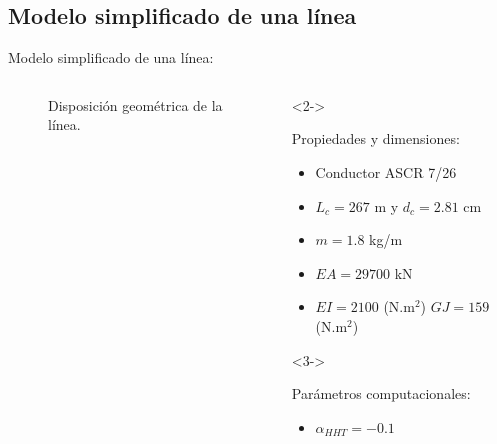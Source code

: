 \documentclass[
  aspectratio=169,
]{beamer}
\begin{document}
\begin{small}
\subsection[Modelo simplificado de una línea]{Modelo simplificado de una línea}
\begin{frame}[t]{Modelo simplificado de una línea:}
	\begin{columns}[T,onlytextwidth]
		\begin{column}{.58\textwidth}
			\begin{minipage}{\textwidth}
					\begin{figure}[htbp]
					\centering
					\caption{Disposición geométrica de la línea.} 
				\end{figure}
			\end{minipage}  
		\end{column}
		\begin{column}{.4\textwidth}
			\begin{onlyenv}<2->
				\begin{minipage}{\textwidth}
					\vspace{-1.7cm}
					\begin{block}{Propiedades y dimensiones:}
						\begin{itemize}
							\item Conductor ASCR 7/26
							\item $L_c = 267$ m y $d_c = 2.81$ cm
							\item $m   = 1.8 $ kg/m
							\item $EA  = 29700$ kN
							\item $EI  = 2100 $ (N.m$^2$) $GJ  = 159$ (N.m$^2$)
						\end{itemize}	 
					\end{block}
				\end{minipage}
			\end{onlyenv}
		\begin{onlyenv}<3->
			\begin{minipage}{\textwidth}
				\begin{block}{Parámetros computacionales:}
					\begin{itemize}
						\item $\alpha_{HHT} = -0.1$

\end{itemize}
\end{block}
\end{minipage}
\end{onlyenv}
\end{column}
\end{columns}
\end{frame}
\end{small}
\end{document}
